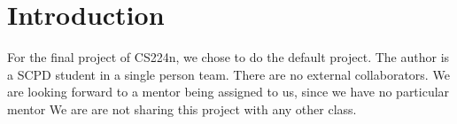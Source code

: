 \section{Introduction}
\label{sec:introduction}

For the final project of CS224n, we chose to do the default project. The author is a SCPD student in a single person team. There are no external collaborators. We are looking forward to a mentor being assigned to us, since we have no particular mentor
We are are not sharing this project with any other class.

